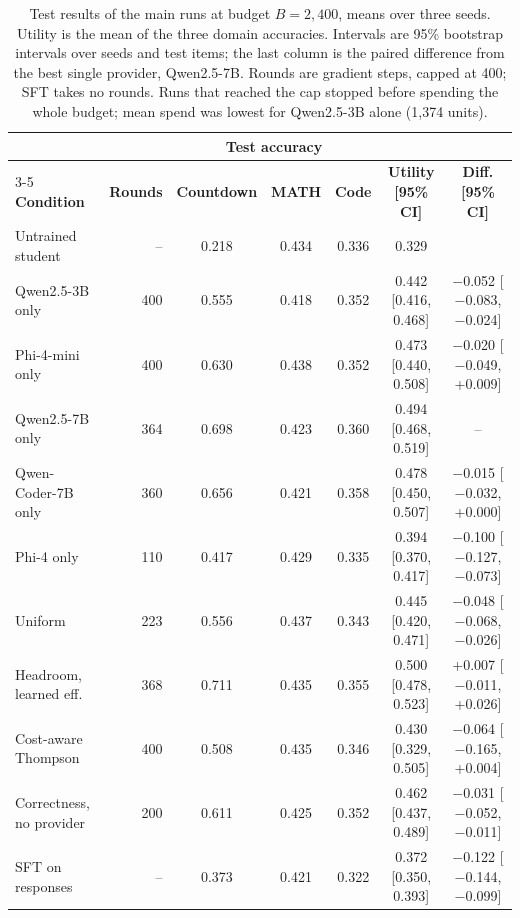 \begin{table}[htbp]
\centering
\footnotesize
\setlength{\tabcolsep}{2.5pt}
\begin{tabular}{@{}lrccccc@{}}
\toprule
 & & \multicolumn{3}{c}{\textbf{Test accuracy}} & & \\
\cmidrule(l){3-5}
\textbf{Condition} & \textbf{Rounds} & \textbf{Countdown} & \textbf{MATH} & \textbf{Code} & \textbf{Utility [95\% CI]} & \textbf{Diff. [95\% CI]} \\
\midrule
Untrained student & -- & 0.218 & 0.434 & 0.336 & 0.329 & \\
\midrule
Qwen2.5-3B only & 400 & 0.555 & 0.418 & 0.352 & 0.442 [0.416, 0.468] & $-$0.052 [$-$0.083, $-$0.024] \\
Phi-4-mini only & 400 & 0.630 & 0.438 & 0.352 & 0.473 [0.440, 0.508] & $-$0.020 [$-$0.049, +0.009] \\
Qwen2.5-7B only & 364 & 0.698 & 0.423 & 0.360 & 0.494 [0.468, 0.519] & -- \\
Qwen-Coder-7B only & 360 & 0.656 & 0.421 & 0.358 & 0.478 [0.450, 0.507] & $-$0.015 [$-$0.032, +0.000] \\
Phi-4 only & 110 & 0.417 & 0.429 & 0.335 & 0.394 [0.370, 0.417] & $-$0.100 [$-$0.127, $-$0.073] \\
\midrule
Uniform & 223 & 0.556 & 0.437 & 0.343 & 0.445 [0.420, 0.471] & $-$0.048 [$-$0.068, $-$0.026] \\
Headroom, learned eff. & 368 & 0.711 & 0.435 & 0.355 & 0.500 [0.478, 0.523] & +0.007 [$-$0.011, +0.026] \\
Cost-aware Thompson & 400 & 0.508 & 0.435 & 0.346 & 0.430 [0.329, 0.505] & $-$0.064 [$-$0.165, +0.004] \\
\midrule
Correctness, no provider & 200 & 0.611 & 0.425 & 0.352 & 0.462 [0.437, 0.489] & $-$0.031 [$-$0.052, $-$0.011] \\
SFT on responses & -- & 0.373 & 0.421 & 0.322 & 0.372 [0.350, 0.393] & $-$0.122 [$-$0.144, $-$0.099] \\
\bottomrule
\end{tabular}
\caption{Test results of the main runs at budget $B = 2{,}400$, means over three seeds. Utility is the mean of the three domain accuracies. Intervals are 95\% bootstrap intervals over seeds and test items; the last column is the paired difference from the best single provider, Qwen2.5-7B. Rounds are gradient steps, capped at 400; SFT takes no rounds. Runs that reached the cap stopped before spending the whole budget; mean spend was lowest for Qwen2.5-3B alone (1,374 units).}
\label{pre:tab:h3}
\end{table}
